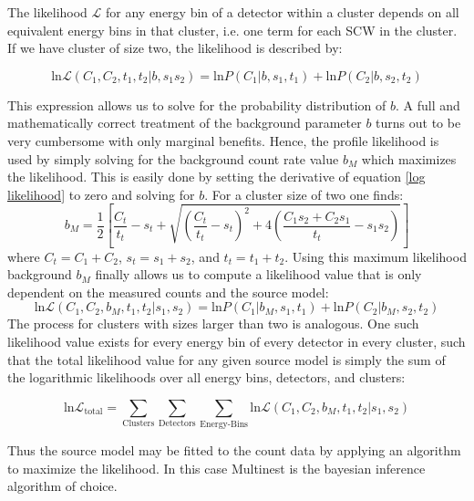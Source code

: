 \documentclass{report}
\begin{document}
The likelihood $\mathcal{L}$ for any energy bin of a detector within a cluster depends on all equivalent energy bins in that cluster, i.e. one term for each SCW in the cluster. If we have cluster of size two, the likelihood is described by:

\begin{equation}\label{log likelihood}
    \text{ln}\mathcal{L}(C_1, C_2, t_1, t_2\vert b, s_1 s_2) = \text{ln}P(C_1 \vert b, s_1, t_1) + \text{ln}P(C_2 \vert b, s_2, t_2)
\end{equation}

This expression allows us to solve for the probability distribution of $b$. A full and mathematically correct treatment of the background parameter $b$ turns out to be very cumbersome with only marginal benefits. Hence, the profile likelihood is used by simply solving for the background count rate value $b_M$ which maximizes the likelihood. This is easily done by setting the derivative of equation \ref{log likelihood} to zero and solving for $b$. For a cluster size of two one finds:
\begin{equation} \label{eq: max lik back}
    b_M = \frac{1}{2} \left[ \frac{C_t}{t_t} - s_t + \sqrt{\left( \frac{C_t}{t_t} - s_t\right)^2 + 4 \left( \frac{C_1s_2+C_2s_1}{t_t}-s_1s_2\right)}\right]
\end{equation}
where $C_t=C_1+C_2$, $s_t=s_1+s_2$, and $t_t=t_1+t_2$. Using this maximum likelihood background $b_M$ finally allows us to compute a likelihood value that is only dependent on the measured counts and the source model:
\begin{equation} \label{log_likelihood final}
    \text{ln}\mathcal{L}(C_1, C_2, b_M, t_1, t_2 \vert s_1, s_2) = \text{ln}P(C_1 \vert b_M, s_1, t_1) + \text{ln}P(C_2 \vert b_M, s_2, t_2)
\end{equation}
The process for clusters with sizes larger than two is analogous. One such likelihood value exists for every energy bin of every detector in every cluster, such that the total likelihood value for any given source model is simply the sum of the logarithmic likelihoods over all energy bins, detectors, and clusters:

\begin{equation} \label{total log likelihood}
  \text{ln}\mathcal{L}_{\text{total}} = \sum_{\text{Clusters}}\sum_{\text{Detectors}}\sum_{\text{Energy-Bins}} \text{ln}\mathcal{L}(C_1, C_2, b_M, t_1, t_2 \vert s_1, s_2)
\end{equation}

Thus the source model may be fitted to the count data by applying an algorithm to maximize the likelihood. In this case Multinest \cite{Feroz_2019} is the bayesian inference algorithm of choice.
\end{document}
